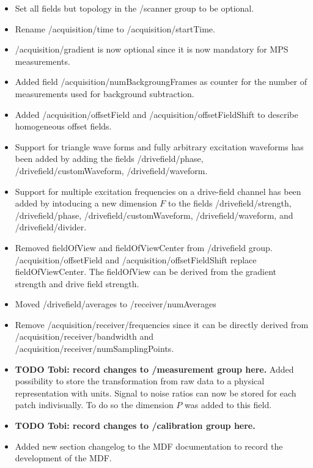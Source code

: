 \documentclass[landscape,a4paper]{article} %
\newcommand{\inlvar}[1]{{\ttfamily#1}}
\begin{document}
\begin{multicols}{2}
\begin{itemize}
	\item Set all fields but \inlvar{topology} in the \inlvar{/scanner} group to be optional.
	\item Rename \inlvar{/acquisition/time} to \inlvar{/acquisition/startTime}.
	\item \inlvar{/acquisition/gradient} is now optional since it is now mandatory for MPS measurements.
	\item Added field \inlvar{/acquisition/numBackgroungFrames} as counter for the number of measurements used for background subtraction.
	\item Added \inlvar{/acquisition/offsetField} and \inlvar{/acquisition/offsetFieldShift} to describe homogeneous offset fields.
	\item Support for triangle wave forms and fully arbitrary excitation waveforms has been added by adding the fields \inlvar{/drivefield/phase}, \inlvar{/drivefield/customWaveform}, \inlvar{/drivefield/waveform}.
	\item Support for multiple excitation frequencies on a drive-field channel has been added by intoducing a new dimension $F$ to the fields \inlvar{/drivefield/strength}, \inlvar{/drivefield/phase}, \inlvar{/drivefield/customWaveform}, \inlvar{/drivefield/waveform}, and \inlvar{/drivefield/divider}.
	\item Removed \inlvar{fieldOfView} and \inlvar{fieldOfViewCenter} from \inlvar{/drivefield} group. \inlvar{/acquisition/offsetField} and \inlvar{/acquisition/offsetFieldShift} replace \inlvar{fieldOfViewCenter}. The \inlvar{fieldOfView} can be derived from the gradient strength and drive field strength.
	\item Moved \inlvar{/drivefield/averages} to \inlvar{/receiver/numAverages}
	\item Remove \inlvar{/acquisition/receiver/frequencies} since it can be directly derived from \inlvar{/acquisition/receiver/bandwidth} and \inlvar{/acquisition/receiver/numSamplingPoints}.
	\item \textbf{TODO Tobi: record changes to \inlvar{/measurement} group here.} Added possibility to store the transformation from raw data to a physical representation with units. Signal to noise ratios can now be stored for each patch indivisually. To do so the dimension $P$ was added to this field.
	\item \textbf{TODO Tobi: record changes to \inlvar{/calibration} group here.} 
	\item Added new section changelog to the MDF documentation to record the development of the MDF.
\end{itemize}



\end{multicols}
\end{document}
